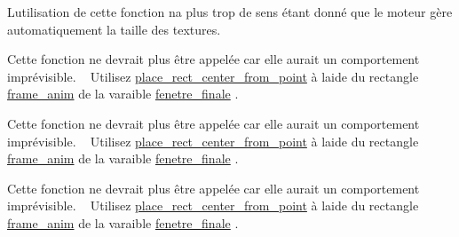 
\begin{DoxyRefList}
\item[Membre \mbox{\hyperlink{affichage_8h_a3e6b4564952e31a2d9e9d0c98dd6ee78}{def\+\_\+texture\+\_\+taille}} (t\+\_\+aff $\ast$a\+\_\+modifier, const int longueur, const int largeur)]\label{deprecated__deprecated000002}%
%
L\textquotesingle{}utilisation de cette fonction n\textquotesingle{}a plus trop de sens étant donné que le moteur gère automatiquement la taille des textures. 
\item[Membre \mbox{\hyperlink{affichage_8h_a5911c692b804289a22f5a161b4fe2286}{deplacer\+\_\+texture\+\_\+centre}} (t\+\_\+aff $\ast$texture, int x, int y)]\label{deprecated__deprecated000001}%
%
Cette fonction ne devrait plus être appelée car elle aurait un comportement imprévisible. ~\newline
 Utilisez \mbox{\hyperlink{affichage_8h_a26cf1d2055162e3bf7166de2f55902f9}{place\+\_\+rect\+\_\+center\+\_\+from\+\_\+point}} à l\textquotesingle{}aide du rectangle \mbox{\hyperlink{structs__aff_aefd6b2f2f56383a8cba0193ff88593dc}{frame\+\_\+anim}} de la varaible \mbox{\hyperlink{affichage_8h_aef49d39125567f1a9d5ed0561ea60edc}{fenetre\+\_\+finale}} . 
\item[Membre \mbox{\hyperlink{affichage_8h_a508ce5ebec0cacf99a3bbddd33d6880f}{rect\+\_\+centre}} (S\+D\+L\+\_\+\+Rect $\ast$rectangle)]\label{deprecated__deprecated000005}%
%
Cette fonction ne devrait plus être appelée car elle aurait un comportement imprévisible. ~\newline
 Utilisez \mbox{\hyperlink{affichage_8h_a26cf1d2055162e3bf7166de2f55902f9}{place\+\_\+rect\+\_\+center\+\_\+from\+\_\+point}} à l\textquotesingle{}aide du rectangle \mbox{\hyperlink{structs__aff_aefd6b2f2f56383a8cba0193ff88593dc}{frame\+\_\+anim}} de la varaible \mbox{\hyperlink{affichage_8h_aef49d39125567f1a9d5ed0561ea60edc}{fenetre\+\_\+finale}} . 
\item[Membre \mbox{\hyperlink{affichage_8h_a6bd4bd87195563a7315afb0fda7fe6d7}{rect\+\_\+centre\+\_\+x}} (S\+D\+L\+\_\+\+Rect $\ast$rectangle)]\label{deprecated__deprecated000003}%
%
Cette fonction ne devrait plus être appelée car elle aurait un comportement imprévisible. ~\newline
 Utilisez \mbox{\hyperlink{affichage_8h_a26cf1d2055162e3bf7166de2f55902f9}{place\+\_\+rect\+\_\+center\+\_\+from\+\_\+point}} à l\textquotesingle{}aide du rectangle \mbox{\hyperlink{structs__aff_aefd6b2f2f56383a8cba0193ff88593dc}{frame\+\_\+anim}} de la varaible \mbox{\hyperlink{affichage_8h_aef49d39125567f1a9d5ed0561ea60edc}{fenetre\+\_\+finale}} . 

\end{DoxyRefList}
